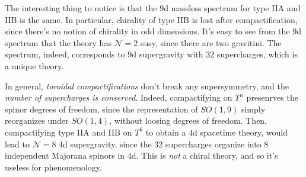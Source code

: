 The interesting thing to notice is that the $9$d massless spectrum for type IIA and IIB is the same. In particular, chirality of type IIB is lost after compactification, since there's no notion of chirality in odd dimensions. It's easy to see from the $9$d spectrum that the theory has $\mathcal{N} = 2$ susy, since there are two gravitini. The spectrum, indeed, corresponds to $9$d supergravity with $32$ supercharges, which is a unique theory.

In general, \emph{toroidal compactifications} don't break any supersymmetry, and the \emph{number of supercharges is conserved}. Indeed, compactifying on $T^n$ presenrves the spinor degrees of freedom, since the representation of $SO(1,9)$ simply reorganizes under $SO(1,4)$, without loosing degrees of freedom. Then, compactifying type IIA and IIB on $T^6$ to obtain a $4$d spacetime theory, would lead to $\mathcal{N}=8$ $4$d supergravity, since the $32$ supercharges organize into $8$ independent Majorana spinors in $4$d. This is \emph{not} a chiral theory, and so it's useless for phenomenology.